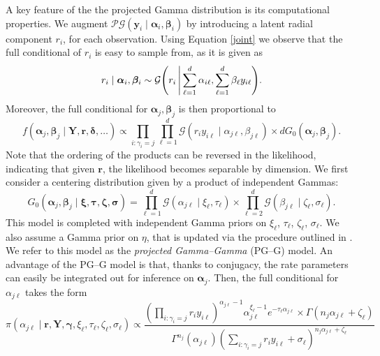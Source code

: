 A key feature of the the projected Gamma distribution is its computational properties. We augment 
$\mathcal{PG}(\bm{y}_i\mid\bm{\alpha}_i,\bm{\beta}_i) $ by introducing a latent radial component $r_i$, 
for each observation. Using Equation \eqref{joint} we observe that the 
full conditional of $r_i$ is easy to sample from, as it is given as
\begin{equation}
    r_i\mid\bm{\alpha}_i,\bm{\beta}_i \sim \mathcal{G}\left(r_i \bigmid \sum_{\ell = 1}^d\alpha_{i\ell}, \sum_{\ell = 1}^d\beta_{\ell} y_{i\ell}\right).
\end{equation}
Moreover,  the full conditional for $\bm{\alpha}_j,\bm{\beta}_j$ is then proportional to
\begin{equation}
    f(\bm{\alpha}_j,\bm{\beta}_j\mid \bm{Y},\bm{r},\bm{\delta},\ldots) \propto \prod_{i:\gamma_i = j}\prod_{\ell = 1}^d\mathcal{G}\left(r_iy_{i\ell}\mid\alpha_{j\ell},\beta_{j\ell}\right) \times dG_0(\bm{\alpha}_j,\bm{\beta}_j).
\end{equation}
Note that the ordering of the products can be reversed in the likelihood, indicating that given $\bm{r}$, 
the likelihood becomes separable by dimension.
We first consider a centering distribution given by a product of independent Gammas:
\begin{equation}
    G_0(\bm{\alpha}_j,\bm{\beta}_j\mid \bm{\xi},\bm{\tau},\bm{\zeta},\bm{\sigma}) = \prod_{\ell = 1}^d\mathcal{G}(\alpha_{j\ell}\mid \xi_{\ell},\tau_{\ell})\times\prod_{\ell = 2}^d\mathcal{G}(\beta_{j\ell}\mid\zeta_{\ell},\sigma_{\ell}).
\end{equation}
This model is completed with independent Gamma priors on $\xi_{\ell}$, $\tau_{\ell}$, $\zeta_{\ell}$, $\sigma_{\ell}$.  We also assume a Gamma prior on $\eta$, that is updated via the procedure outlined in \cite{escobar1995}.  We refer to this model as the \emph{projected Gamma--Gamma} (PG--G) model.  An advantage of the PG--G model is that, thanks to conjugacy, the rate parameters can easily be integrated out for inference on $\bm{\alpha}_j$.  Then, the full conditional for $\alpha_{j\ell}$ takes the form
\begin{equation}
    \pi(\alpha_{j\ell}\mid \bm{r},\bm{Y},\bm{\gamma},\xi_\ell,\tau_\ell,\zeta_\ell,\sigma_\ell) \propto \frac{\left(\prod_{i:\gamma_i = j}r_iy_{i\ell}\right)^{\alpha_{j\ell} - 1}\alpha_{j\ell}^{\xi_\ell - 1}e^{-\tau_\ell \alpha_{j\ell}}\times\Gamma\left(n_j\alpha_{j\ell} + \zeta_{\ell}\right)}{\Gamma^{n_j}(\alpha_{j\ell})\left(\sum_{i:\gamma_i = j}r_iy_{i\ell} + \sigma_{\ell}\right)^{n_j\alpha_{j\ell} + \zeta_{\ell}}}
\end{equation}
